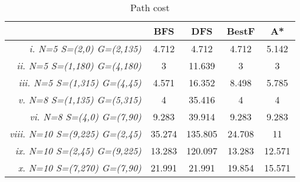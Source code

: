 \begin{table}[ht]
\centering
\begin{tabular}{r|c|c|c|c|}
\cline{2-5}
\multicolumn{1}{l|}{} & \textbf{BFS} & \textbf{DFS} & \textbf{BestF} & \textbf{A*} \\ \hline
\multicolumn{1}{|r|}{\textit{i. N=5 S=(2,0) G=(2,135)}} & 4.712 & 4.712 & 4.712 & 5.142 \\ \hline
\multicolumn{1}{|r|}{\textit{ii. N=5 S=(1,180) G=(4,180)}} & 3 & 11.639 & 3 & 3 \\ \hline
\multicolumn{1}{|r|}{\textit{iii. N=5 S=(1,315) G=(4,45)}} & 4.571 & 16.352 & 8.498 & 5.785 \\ \hline
\multicolumn{1}{|r|}{\textit{v. N=8 S=(1,135) G=(5,315)}} & 4 & 35.416 & 4 & 4 \\ \hline
\multicolumn{1}{|r|}{\textit{vi. N=8 S=(4,0) G=(7,90)}} & 9.283 & 39.914 & 9.283 & 9.283 \\ \hline
\multicolumn{1}{|r|}{\textit{viii. N=10 S=(9,225) G=(2,45)}} & 35.274 & 135.805 & 24.708 & 11 \\ \hline
\multicolumn{1}{|r|}{\textit{ix. N=10 S=(2,45) G=(9,225)}} & 13.283 & 120.097 & 13.283 & 12.571 \\ \hline
\multicolumn{1}{|r|}{\textit{x. N=10 S=(7,270) G=(7,90)}} & 21.991 & 21.991 & 19.854 & 15.571 \\ \hline
\end{tabular}
\caption{Path cost}
\label{tab:path_cost}
\end{table}